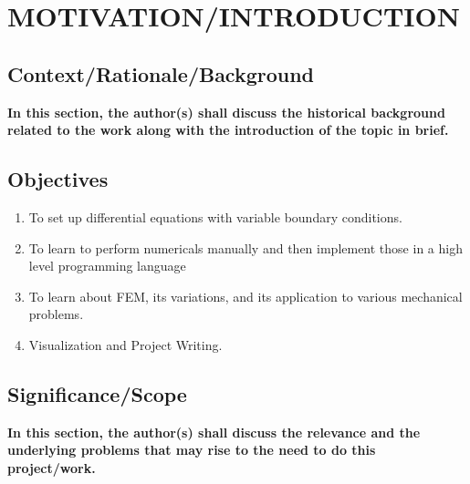 




\chapter{MOTIVATION/INTRODUCTION}

\section{{\bf{Context/Rationale/Background}}}
{\bf\color{red}In this section, the author(s) shall discuss the  historical background related to the work along with the introduction of the topic in brief.}








\section{{\bf{Objectives}}}
{\bf\color{black}
\begin{enumerate}
 \item To set up differential equations with variable boundary conditions. 
 \item  To learn to perform numericals manually and then implement
 those in a high level programming language
 \item To learn about FEM, its variations, and its application to various
 mechanical problems.
 \item Visualization and Project Writing.
\end{enumerate}
}

\section{\bf Significance/Scope}
{\bf\color{red}In this section, the author(s) shall discuss the relevance and the underlying problems that may rise to the need to do this project/work.}

